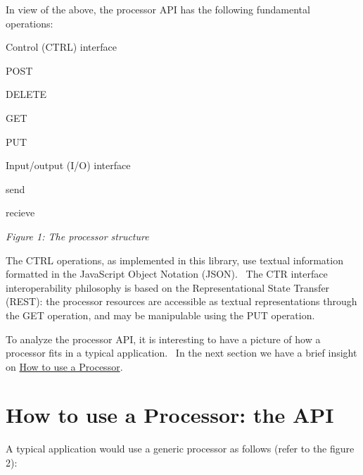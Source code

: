 In view of the above, the processor A\+PI has the following fundamental operations\+:~\newline

\begin{DoxyEnumerate}
\item Control (C\+T\+RL) interface
\begin{DoxyItemize}
\item P\+O\+ST~\newline

\item D\+E\+L\+E\+TE~\newline

\item G\+ET~\newline

\item P\+UT
\end{DoxyItemize}
\item Input/output (I/O) interface
\begin{DoxyItemize}
\item send~\newline

\item recieve
\end{DoxyItemize}
\end{DoxyEnumerate}

 {\itshape Figure 1\+: The processor structure}

The C\+T\+RL operations, as implemented in this library, use textual information formatted in the Java\+Script Object Notation (J\+S\+ON).~\newline
 The C\+TR interface interoperability philosophy is based on the Representational State Transfer (R\+E\+ST)\+: the processor resources are accessible as textual representations through the G\+ET operation, and may be manipulable using the P\+UT operation.

To analyze the processor A\+PI, it is interesting to have a picture of how a processor fits in a typical application.~\newline
 In the next section we have a brief insight on \hyperlink{md_DOCUMENTATION_How_to_use_a_Processor_the_API}{How to use a Processor}.\hypertarget{md_DOCUMENTATION_How_to_use_a_Processor_the_API}{}\section{How to use a Processor\+: the A\+P\+I }\label{md_DOCUMENTATION_How_to_use_a_Processor_the_API}
A typical application would use a generic processor as follows (refer to the figure 2)\+:~\newline


